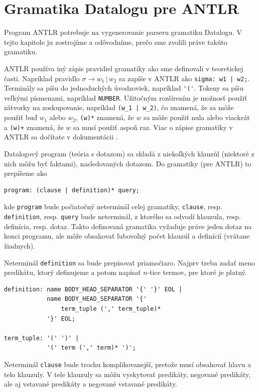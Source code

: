 \section{Gramatika Datalogu pre ANTLR}
Program ANTLR potrebuje na vygenerovanie parseru gramatiku Datalogu. V tejto kapitole ju zostrojíme
a odôvodníme, prečo sme zvolili práve takúto gramatiku.

\vline

ANTLR používa iný zápis pravidiel gramatiky ako sme definovali v teoretickej časti. Napríklad
pravidlo $\sigma \rightarrow w_1 \, | \, w_2$ sa zapíše v ANTLR ako \verb$sigma: w1 | w2;$.
Terminály sa píšu do jednoduchých úvodzoviek, napríklad \verb$'('$. Tokeny sa píšu veľkými
písmenami, napríklad \verb$NUMBER$. Užitočným rozšírením je možnosť použiť zátvorky na zoskupovanie,
napríklad \verb$(w_1 | w_2)$, čo znamená, že sa môže použiť buď $w_1$ alebo $w_2$, \verb$(w)*$
znamená, že $w$ sa môže použiť nula alebo viackrát a \verb$(w)+$ znamená, že $w$ sa musí použiť
aspoň raz. Viac o zápise gramatiky v ANTLR sa dočítate v dokumentácii \cite{antlrDoc}.

\vline

Datalogový program (teória s dotazom) sa skladá z niekoľkých klauzúl (niektoré z nich môžu byť
faktami), nasledovaných dotazom. Do gramatiky (pre ANTLR) to prepíšeme ako
\begin{verbatim}
program: (clause | definition)* query;
\end{verbatim}
kde \verb|program| bude počiatočný neterminál celej gramatiky, \verb|clause|, resp.
\verb|definition|, resp. \verb|query| bude neterminál, z ktorého sa odvodí klauzula, resp.
definícia, resp. dotaz. Takto definovaná gramatika vyžaduje práve jeden dotaz na konci programu, ale
môže obsahovať ľubovoľný počet klauzúl a definícií (vrátane žiadnych).

Neterminál \verb|definition| sa bude prepisovať priamočiaro. Najprv treba zadať meno predikátu, ktorý
definujeme a potom napísať $n$-tice termov, pre ktoré je platný.

\begin{verbatim}
definition: name BODY_HEAD_SEPARATOR '{' '}' EOL |
            name BODY_HEAD_SEPARATOR '{'
                term_tuple (',' term_tuple)*
            '}' EOL;

term_tuple: '(' ')' |
            '(' term (',' term)* ')';
\end{verbatim}

Neterminál \verb|clause| bude trochu komplikovanejší, pretože musí obsahovať hlavu a telo klauzuly. V tele
klauzuly sa môžu vyskytovať predikáty, negované predikáty, ale aj vstavané predikáty a negované
vstavané predikáty.

